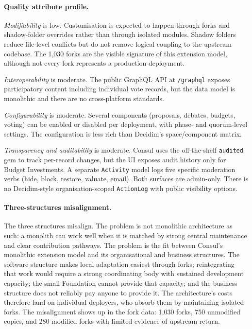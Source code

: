 \documentclass[11pt,a4paper]{article}
\begin{document}
\paragraph{Quality attribute profile.}
\emph{Modifiability} is low. Customisation is expected to happen through forks and shadow-folder overrides rather than through isolated modules. Shadow folders reduce file-level conflicts but do not remove logical coupling to the upstream codebase. The 1{,}030 forks are the visible signature of this extension model, although not every fork represents a production deployment.

\emph{Interoperability} is moderate. The public GraphQL API at \texttt{/graphql} exposes participatory content including individual vote records, but the data model is monolithic and there are no cross-platform standards.

\emph{Configurability} is moderate. Several components (proposals, debates, budgets, voting) can be enabled or disabled per deployment, with phase- and quorum-level settings. The configuration is less rich than Decidim's space/component matrix.

\emph{Transparency and auditability} is moderate. Consul uses the off-the-shelf \texttt{audited} gem to track per-record changes, but the UI exposes audit history only for Budget Investments. A separate \texttt{Activity} model logs five specific moderation verbs (hide, block, restore, valuate, email). Both surfaces are admin-only. There is no Decidim-style organisation-scoped \texttt{ActionLog} with public visibility options.

\paragraph{Three-structures misalignment.}
The three structures misalign. The problem is not monolithic architecture as such: a monolith can work well when it is matched by strong central maintenance and clear contribution pathways. The problem is the fit between Consul's monolithic extension model and its organisational and business structures. The software structure makes local adaptation easiest through forks; reintegrating that work would require a strong coordinating body with sustained development capacity; the small Foundation cannot provide that capacity; and the business structure does not reliably pay anyone to provide it. The architecture's costs therefore land on individual deployers, who absorb them by maintaining isolated forks. The misalignment shows up in the fork data: 1{,}030 forks, 750 unmodified copies, and 280 modified forks with limited evidence of upstream return.
\end{document}
